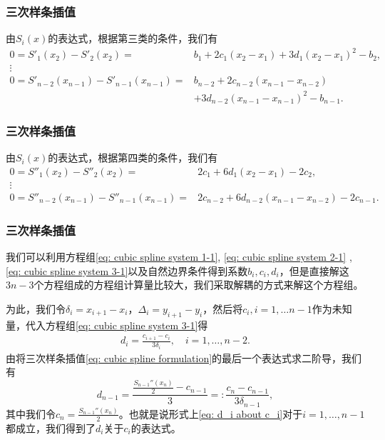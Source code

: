 \documentclass[10pt]{beamer}
\begin{document}
\begin{frame}
\frametitle{三次样条插值}
由$S_i(x)$的表达式，根据第三类的条件，我们有
\begin{align}
\label{eq: cubic spline system 2-1}
0 = S'_1(x_2) - S'_2(x_2) =& b_1 + 2c_1(x_2 - x_1) + 3d_1(x_2 - x_1)^2 - b_2, \nonumber \\
\vdots \nonumber \\
0 = S'_{n-2}(x_{n-1}) - S'_{n-1}(x_{n-1}) =& b_{n-2} + 2c_{n-2}(x_{n-1} - x_{n-2}) \nonumber \\
                                                                  & + 3d_{n-2}(x_{n-1} - x_{n-1})^2 - b_{n-1}. 
 \end{align}
\end{frame}


\begin{frame}
\frametitle{三次样条插值}
由$S_i(x)$的表达式，根据第四类的条件，我们有
\begin{align}
\label{eq: cubic spline system 3-1}
0 = S''_1(x_2) - S''_2(x_2) =& 2c_1 + 6 d_1 (x_2 - x_1) - 2c_2, \nonumber \\
\vdots \nonumber \\
0 = S''_{n-2}(x_{n-1}) - S''_{n-1}(x_{n-1}) =& 2c_{n-2} + 6 d_{n-2} (x_{n-1} - x_{n-2}) - 2c_{n-1}. 
 \end{align}
\end{frame}


\begin{frame}
\frametitle{三次样条插值}
我们可以利用方程组\eqref{eq: cubic spline system 1-1}, \eqref{eq: cubic spline system 2-1} , \eqref{eq: cubic spline system 3-1}以及自然边界条件得到系数$b_i, c_i, d_i$，但是直接解这$3n-3$个方程组成的方程组计算量比较大，我们采取解耦的方式来解这个方程组。

\vspace{0.2cm}

为此，我们令$\delta_i = x_{i+1} - x_i$，$\Delta_i = y_{i+1} - y_i$，然后将$c_i, i = 1, \ldots n-1$作为未知量，代入方程组\eqref{eq: cubic spline system 3-1}得
\begin{align}
\label{eq: d_i about c_i}
d_i = \frac{c_{i+1} - c_i}{3 \delta_i}, \quad i = 1, \ldots, n-2.
\end{align}
由将三次样条插值\eqref{eq: cubic spline formulation}的最后一个表达式求二阶导，我们有
\begin{equation}
d_{n-1} = \frac{\frac{S_{n-1}''(x_n)}{2}-c_{n-1}}{3} =:  \frac{c_n - c_{n-1}}{3\delta_{n-1}},
\end{equation}
其中我们令$c_{n} = \frac{S_{n-1}''(x_n)}{2}$。也就是说形式上\eqref{eq: d_i about c_i}对于$i = 1, \ldots, n-1$都成立，我们得到了$d_i$关于$c_i$的表达式。
\end{frame}
\end{document}
